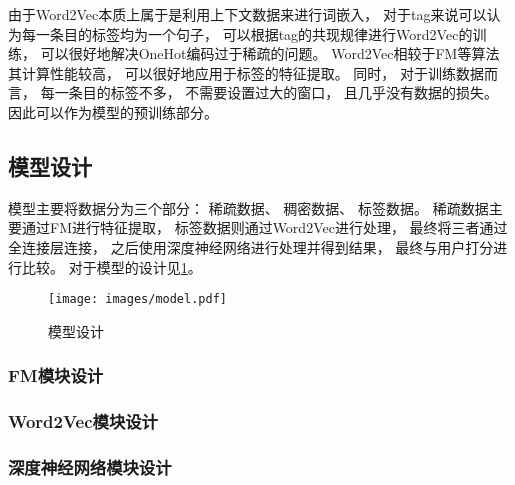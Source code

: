 由于Word2Vec本质上属于是利用上下文数据来进行词嵌入，
对于tag来说可以认为每一条目的标签均为一个句子，
可以根据tag的共现规律进行Word2Vec的训练，
可以很好地解决OneHot编码过于稀疏的问题。
Word2Vec相较于FM等算法其计算性能较高，
可以很好地应用于标签的特征提取。
同时，
对于训练数据而言，
每一条目的标签不多，
不需要设置过大的窗口，
且几乎没有数据的损失。
因此可以作为模型的预训练部分。

\subsection{模型设计}

模型主要将数据分为三个部分：
稀疏数据、
稠密数据、
标签数据。
稀疏数据主要通过FM进行特征提取，
标签数据则通过Word2Vec进行处理，
最终将三者通过全连接层连接，
之后使用深度神经网络进行处理并得到结果，
最终与用户打分进行比较。
对于模型的设计见\cref{fig:model}。

\begin{figure}[!htbp]
    \centering
    \texttt{[image: images/model.pdf]}
    \caption{模型设计}\label{fig:model}
\end{figure}

\subsubsection{FM模块设计}

\subsubsection{Word2Vec模块设计}

\subsubsection{深度神经网络模块设计}